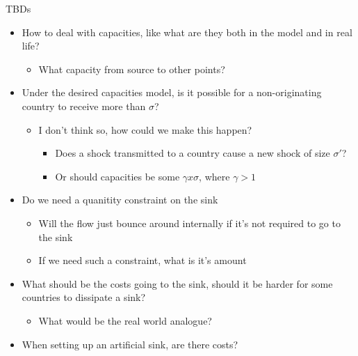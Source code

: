 \documentclass[
  ignorenonframetext,
]{beamer}
\providecommand{\tightlist}{%
  \setlength{\itemsep}{0pt}\setlength{\parskip}{0pt}}
\begin{document}
\begin{frame}{TBDs}
\protect\hypertarget{tbds}{}

\begin{itemize}
\tightlist
\item
  How to deal with capacities, like what are they both in the model and
  in real life?

  \begin{itemize}
  \tightlist
  \item
    What capacity from source to other points?
  \end{itemize}
\item
  Under the desired capacities model, is it possible for a
  non-originating country to receive more than \(\sigma\)?

  \begin{itemize}
  \tightlist
  \item
    I don't think so, how could we make this happen?

    \begin{itemize}
    \tightlist
    \item
      Does a shock transmitted to a country cause a new shock of size
      \(\sigma'\)?
    \item
      Or should capacities be some \(\gamma x\sigma\), where
      \(\gamma>1\)
    \end{itemize}
  \end{itemize}
\item
  Do we need a quanitity constraint on the sink

  \begin{itemize}
  \tightlist
  \item
    Will the flow just bounce around internally if it's not required to
    go to the sink
  \item
    If we need such a constraint, what is it's amount
  \end{itemize}
\item
  What should be the costs going to the sink, should it be harder for
  some countries to dissipate a sink?

  \begin{itemize}
  \tightlist
  \item
    What would be the real world analogue?
  \end{itemize}
\item
  When setting up an artificial sink, are there costs?
\end{itemize}

\end{frame}
\end{document}
